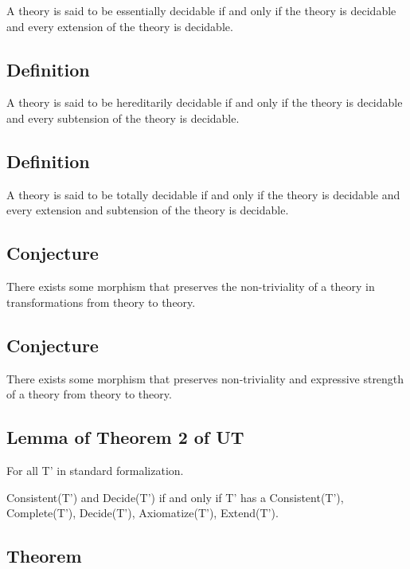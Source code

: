A theory is said to be essentially decidable if and only if the theory
is decidable and every extension of the theory is decidable.

\hypertarget{definition-3}{%
\subsection{Definition}\label{definition-3}}

A theory is said to be hereditarily decidable if and only if the theory
is decidable and every subtension of the theory is decidable.

\hypertarget{definition-4}{%
\subsection{Definition}\label{definition-4}}

A theory is said to be totally decidable if and only if the theory is
decidable and every extension and subtension of the theory is decidable.

\hypertarget{conjecture}{%
\subsection{Conjecture}\label{conjecture}}

There exists some morphism that preserves the non-triviality of a theory
in transformations from theory to theory.

\hypertarget{conjecture-1}{%
\subsection{Conjecture}\label{conjecture-1}}

There exists some morphism that preserves non-triviality and expressive
strength of a theory from theory to theory.

\hypertarget{lemma-of-theorem-2-of-ut}{%
\subsection{Lemma of Theorem 2 of UT}\label{lemma-of-theorem-2-of-ut}}

For all T' in standard formalization.

Consistent(T') and Decide(T') if and only if T' has a Consistent(T'),
Complete(T'), Decide(T'), Axiomatize(T'), Extend(T').

\hypertarget{theorem-5}{%
\subsection{Theorem}\label{theorem-5}}

